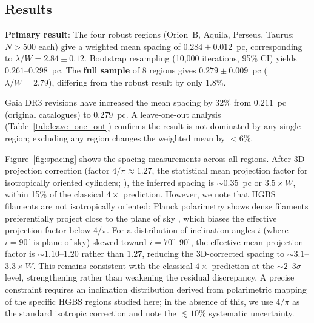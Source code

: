 \documentclass[twoside,twocolumn]{mnras}
\begin{document}
\subsection{Results}
\label{sec:results}

\textbf{Primary result}: The four robust regions (Orion~B, Aquila, Perseus, Taurus;
$N > 500$ each) give a weighted mean spacing of $0.284 \pm 0.012$~pc,
corresponding to $\lambda/W = 2.84 \pm 0.12$. Bootstrap resampling (10,000 iterations,
95\% CI) yields $0.261$--$0.298$~pc. The \textbf{full sample} of 8 regions gives
$0.279 \pm 0.009$~pc ($\lambda/W = 2.79$), differing from the robust result by
only 1.8\%.

Gaia DR3 revisions have increased the mean spacing by 32\% from $0.211$~pc (original
catalogues) to $0.279$~pc. A leave-one-out analysis (Table~\ref{tab:leave_one_out})
confirms the result is not dominated by any single region; excluding any region changes
the weighted mean by $<6\%$.

Figure~\ref{fig:spacing} shows the spacing measurements across all regions.
After 3D projection correction (factor $4/\pi \approx 1.27$, the statistical mean projection factor for isotropically oriented cylinders; \citealt{Andre2010}), the inferred spacing is ${\sim}0.35$~pc or $3.5\times W$, within 15\% of the classical $4\times$ prediction. However, we note that HGBS filaments are not isotropically oriented: Planck polarimetry shows dense filaments preferentially project close to the plane of sky \citep{Planck2016}, which biases the effective projection factor below $4/\pi$. For a distribution of inclination angles $i$ (where $i=90^\circ$ is plane-of-sky) skewed toward $i=70^\circ$--$90^\circ$, the effective mean projection factor is ${\sim}1.10$--$1.20$ rather than $1.27$, reducing the 3D-corrected spacing to ${\sim}3.1$--$3.3\times W$. This remains consistent with the classical $4\times$ prediction at the $\sim 2$--$3\sigma$ level, strengthening rather than weakening the residual discrepancy. A precise constraint requires an inclination distribution derived from polarimetric mapping of the specific HGBS regions studied here; in the absence of this, we use $4/\pi$ as the standard isotropic correction and note the $\lesssim 10\%$ systematic uncertainty.
\end{document}
